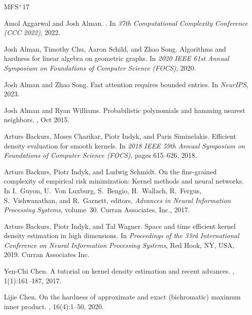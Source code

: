 \documentclass[10pt,a4paper]{article}
\theoremstyle{remark}
\numberwithin{equation}{section}
\numberwithin{theorem}{section}
\begin{document}
\newcommand{\etalchar}[1]{$^{#1}$}
\begin{thebibliography}{MFS{\etalchar{+}}17}

Amol Aggarwal and Josh Alman.
.
\newblock In {\em 37th Computational Complexity Conference (CCC 2022)}, 2022.

Josh Alman, Timothy Chu, Aaron Schild, and Zhao Song.
\newblock Algorithms and hardness for linear algebra on geometric graphs.
\newblock In {\em 2020 IEEE 61st Annual Symposium on Foundations of Computer
  Science (FOCS)}, 2020.

Josh Alman and Zhao Song.
\newblock Fast attention requires bounded entries.
\newblock In {\em NeurIPS}, 2023.

Josh Alman and Ryan Williams.
\newblock Probabilistic polynomials and hamming nearest neighbors.
, Oct 2015.

Arturs Backurs, Moses Charikar, Piotr Indyk, and Paris Siminelakis.
\newblock Efficient density evaluation for smooth kernels.
\newblock In {\em 2018 IEEE 59th Annual Symposium on Foundations of Computer
  Science (FOCS)}, pages 615--626, 2018.

Arturs Backurs, Piotr Indyk, and Ludwig Schmidt.
\newblock On the fine-grained complexity of empirical risk minimization: Kernel
  methods and neural networks.
\newblock In I.~Guyon, U.~Von Luxburg, S.~Bengio, H.~Wallach, R.~Fergus,
  S.~Vishwanathan, and R.~Garnett, editors, {\em Advances in Neural Information
  Processing Systems}, volume~30. Curran Associates, Inc., 2017.

Arturs Backurs, Piotr Indyk, and Tal Wagner.
\newblock Space and time efficient kernel density estimation in high
  dimensions.
\newblock In {\em Proceedings of the 33rd International Conference on Neural
  Information Processing Systems}, Red Hook, NY, USA, 2019. Curran Associates
  Inc.

Yen-Chi Chen.
\newblock A tutorial on kernel density estimation and recent advances.
, 1(1):161--187, 2017.

Lijie Chen.
\newblock On the hardness of approximate and exact (bichromatic) maximum inner
  product.
, 16(4):1--50, 2020.


\end{thebibliography}
\end{document}
